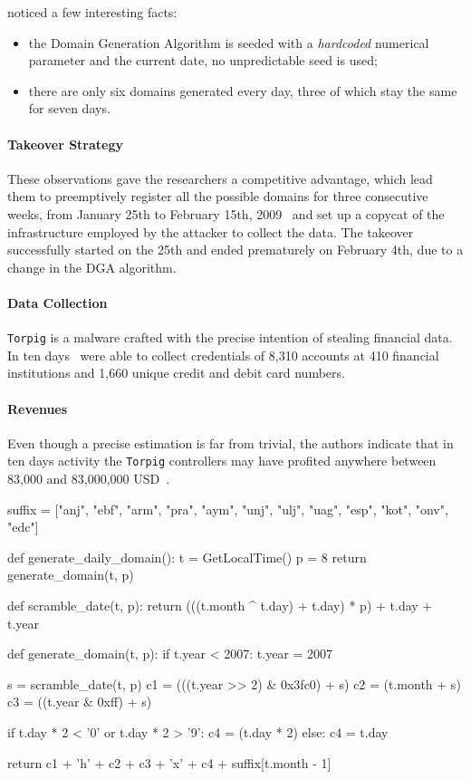 \citet{gross2009} noticed a few interesting facts:
\begin{itemize}
    \item the Domain Generation Algorithm is seeded with a \emph{hardcoded}
        numerical parameter and the current date, no unpredictable seed is
        used;
    \item there are only six domains generated every day, three of which stay
        the same for seven days.
\end{itemize}

\paragraph{Takeover Strategy} These observations gave the researchers a competitive advantage, which lead them to preemptively register all the possible domains for three consecutive
weeks, from January 25th to February 15th, 2009~\cite{gross2009} and set up
a copycat of the infrastructure employed by the attacker to collect the data.
The takeover successfully started on the 25th and ended prematurely on February 4th,
due to a change in the DGA algorithm.

\paragraph{Data Collection} \texttt{Torpig} is a malware crafted with the precise
intention of stealing financial data. In ten days~\citet{gross2009} were able to
collect credentials of 8,310 accounts at 410 financial institutions and 1,660
unique credit and debit card numbers.

\paragraph{Revenues} Even though a precise estimation is far from trivial,
the authors indicate that in ten days activity the \texttt{Torpig} controllers
may have profited anywhere between 83,000 and 83,000,000 USD~\cite{gross2009}.

\begin{pyglist}[language=python,caption={Torpig DGA Python implementation~\citet{gross2009}.}, label=lst:torpig]
suffix = ["anj", "ebf", "arm", "pra", "aym", "unj", "ulj",
          "uag", "esp", "kot", "onv", "edc"]

def generate_daily_domain():
    t = GetLocalTime()
    p = 8
    return generate_domain(t, p)

def scramble_date(t, p):
    return (((t.month ^ t.day) + t.day) * p) + t.day + t.year

def generate_domain(t, p):
    if t.year < 2007:
        t.year = 2007

    s = scramble_date(t, p)
    c1 = (((t.year >> 2) & 0x3fc0) + s) %
    c2 = (t.month + s) %
    c3 = ((t.year & 0xff) + s) %

    if t.day * 2 < '0' or t.day * 2 > '9':
        c4 = (t.day * 2) %
    else:
        c4 = t.day %

    return c1 + 'h' + c2 + c3 + 'x' + c4 + suffix[t.month - 1]
\end{pyglist}

